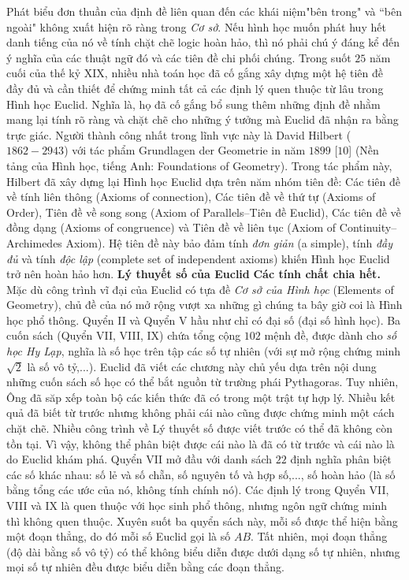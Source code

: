 \begin{multicols}{2}
	Phát biểu đơn thuần của định đề liên quan đến các khái niệm"bên trong" và ``bên ngoài" không xuất hiện rõ ràng trong \textit{Cơ sở}. Nếu hình học muốn phát huy hết danh tiếng của nó về tính chặt chẽ logic hoàn hảo, thì nó phải chú ý đáng kể đến ý nghĩa của các thuật ngữ đó và các tiên đề chi phối chúng. 
	\vskip 0.1cm
	Trong suốt $25$ năm cuối của thế kỷ XIX, nhiều nhà toán học đã cố gắng xây dựng một hệ tiên đề đầy đủ và cần thiết để chứng minh tất cả các định lý quen thuộc từ lâu trong Hình học Euclid. Nghĩa là, họ đã cố gắng bổ sung thêm những định đề nhằm mang lại tính rõ ràng và chặt chẽ cho những ý tưởng mà Euclid đã nhận ra bằng trực giác.  Người thành công nhất trong lĩnh vực này là David Hilbert ($1862-2943$) với tác phẩm Grundlagen der Geometrie in năm $1899$ [$10$] (Nền tảng của Hình học, tiếng Anh: Foundations of Geometry). Trong tác phẩm này, Hilbert đã xây dựng lại Hình học Euclid dựa trên năm nhóm tiên đề: Các tiên đề về tính liên thông (Axioms of connection), Các tiên đề về thứ tự (Axioms of Order), Tiên đề về song song (Axiom of Parallels--Tiên đề Euclid), Các tiên đề về đồng dạng (Axioms of congruence) và Tiên đề về liên tục (Axiom of Continuity--Archimedes Axiom).  Hệ tiên đề này bảo đảm tính \textit{đơn giản} (a simple), tính \textit{đầy đủ} và tính \textit{độc lập} (complete set of independent axioms) khiến Hình học Euclid trở nên hoàn hảo hơn.  
	\vskip 0.1cm
	\textbf{\color{lichsutoanhoc}Lý thuyết số của Euclid}
	\vskip 0.1cm
	\textbf{\color{lichsutoanhoc}Các tính chất chia hết.} Mặc dù công trình vĩ đại của Euclid có tựa đề \textit{Cơ sở của Hình học} (Elements of Geometry), chủ đề của nó mở rộng vượt xa những gì chúng ta bây giờ coi là Hình học phổ thông. Quyển II và Quyển V hầu như chỉ có đại số (đại số hình học). Ba cuốn sách (Quyển VII, VIII, IX) chứa tổng cộng $102$ mệnh đề, được dành cho \textit{số học Hy Lạp}, nghĩa là số học trên tập các số tự nhiên (với sự mở rộng chứng minh $\sqrt{2}$ là số vô tỷ,...). Euclid đã viết các chương này chủ yếu dựa trên nội dung những cuốn sách số học có thể bắt nguồn từ trường phái Pythagoras. Tuy nhiên, Ông đã săp xếp toàn bộ các kiến thức đã có trong một trật tự hợp lý. Nhiều kết quả đã biết từ trước nhưng không phải cái nào cũng được chứng minh một cách chặt chẽ. Nhiều công trình về Lý thuyết số được viết trước có thể đã không còn tồn tại. Vì vậy, không thể phân biệt được cái nào là đã có từ trước và cái nào là do Euclid khám phá. 
	\vskip 0.1cm
	Quyển VII mở đầu với danh sách $22$ định nghĩa phân biệt các số khác nhau: số lẻ và số chẵn, số nguyên tố và hợp số,..., số hoàn hảo (là số bằng tổng các ước của nó, không tính chính nó). Các định lý trong Quyển VII, VIII và IX là quen thuộc với học sinh phổ thông, nhưng ngôn ngữ chứng minh thì không quen thuộc. Xuyên suốt ba quyển sách này, mỗi số được thể hiện bằng một đoạn thẳng, do đó mỗi số Euclid gọi là số $AB$. Tất nhiên, mọi đoạn thẳng (độ dài bằng số vô tỷ) có thể không biểu diễn được dưới dạng số tự nhiên, nhưng mọi số tự nhiên đều được biểu diễn bằng các đoạn thẳng.

\end{multicols}
